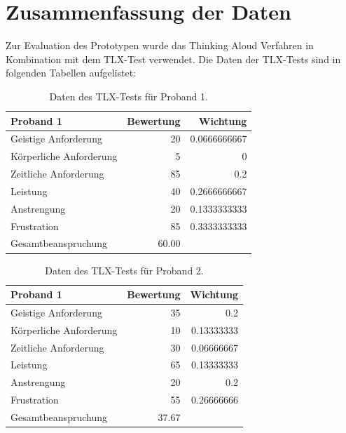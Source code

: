 \section{Zusammenfassung der Daten}

Zur Evaluation des Prototypen wurde das Thinking Aloud Verfahren in Kombination mit dem TLX-Test verwendet. Die Daten der TLX-Tests sind in folgenden Tabellen aufgelistet:

\begin{table}[h]
    \caption{Daten des TLX-Tests für Proband 1.}
    \centering
    \begin{tabular}{l r r}
        Proband 1 & Bewertung & Wichtung \\
        \hline
        Geistige Anforderung & 20 & 0.0666666667 \\
        Körperliche Anforderung & 5 & 0 \\
        Zeitliche Anforderung & 85 & 0.2 \\
        Leistung & 40 & 0.2666666667 \\
        Anstrengung & 20 & 0.1333333333 \\
        Frustration & 85 & 0.3333333333 \\
        \hline
        Gesamtbeanspruchung & 60.00 & \\
    \end{tabular}
\end{table}

\begin{table}[h]
    \caption{Daten des TLX-Tests für Proband 2.}
    \centering
    \begin{tabular}{l r r}
        Proband 1 & Bewertung & Wichtung \\
        \hline
        Geistige Anforderung & 35 & 0.2 \\
        Körperliche Anforderung & 10 & 0.13333333 \\
        Zeitliche Anforderung & 30 & 0.06666667 \\
        Leistung & 65 & 0.13333333 \\
        Anstrengung & 20 & 0.2 \\
        Frustration & 55 & 0.26666666 \\
        \hline
        Gesamtbeanspruchung & 37.67 & \\
    \end{tabular}
\end{table}

